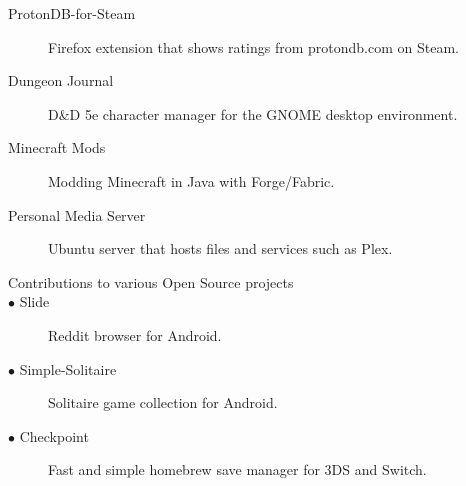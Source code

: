 \documentclass[letterpaper,11pt]{article}
\begin{document}
\begin{description}
\item[ProtonDB-for-Steam] Firefox extension that shows ratings from protondb.com on Steam.
\item[Dungeon Journal] D\&D 5e character manager for the GNOME desktop environment.
\item[Minecraft Mods] Modding Minecraft in Java with Forge/Fabric.
\item[Personal Media Server] Ubuntu server that hosts files and services such as Plex.
\break
\item[Contributions to various Open Source projects]
\item[\quad $\bullet$ Slide] Reddit browser for Android.
\item[\quad $\bullet$ Simple-Solitaire] Solitaire game collection for Android.
\item[\quad $\bullet$ Checkpoint] Fast and simple homebrew save manager for 3DS and Switch.
\end{description}
\end{document}
